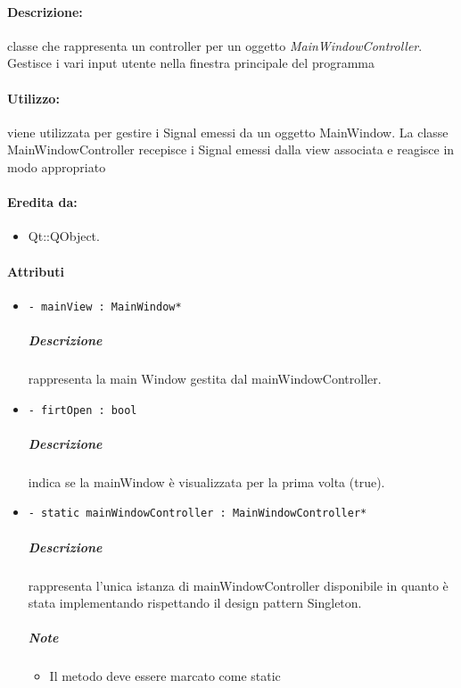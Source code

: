 	\paragraph{Descrizione:} classe che rappresenta un controller per un oggetto \textsl{MainWindowController}. Gestisce i vari input utente nella finestra principale del programma
	\paragraph{Utilizzo:} viene utilizzata per gestire i Signal\g{} emessi da un oggetto MainWindow. La classe MainWindowController recepisce i Signal\g{} emessi dalla view associata e reagisce in modo appropriato
	\paragraph{Eredita da:}
		\begin{itemize}
			\item Qt::QObject.
		\end{itemize}
	\paragraph{Attributi}
		\begin{itemize}
			\item \color{teal} \verb!- mainView : MainWindow*!
			\color{black}
			\subparagraph{Descrizione} rappresenta la main Window gestita dal mainWindowController.
			\item \color{teal} \verb!- firtOpen : bool!
			\color{black}
			\subparagraph{Descrizione} indica se la mainWindow è visualizzata per la prima volta (true).
			\item \color{teal} \verb!- static mainWindowController : MainWindowController*!
			\color{black}
			\subparagraph{Descrizione} rappresenta l'unica istanza di mainWindowController disponibile in quanto è stata implementando rispettando il design pattern\g{} Singleton.
			\subparagraph{Note}
			\begin{itemize}
				\item Il metodo deve essere marcato come static
			\end{itemize}
		\end{itemize}

